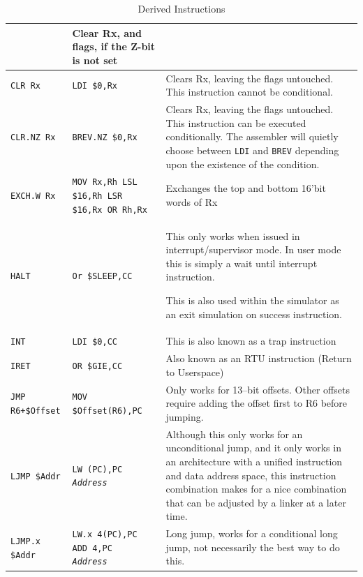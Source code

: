 \documentclass{gqtekspec}
\begin{document}
\begin{table}
\begin{center}
\begin{tabular}{p{1.0in}p{1.5in}p{3in}}
	& Clear Rx, and flags, if the Z-bit is not set \\\hline
{\tt CLR Rx }
	& {\tt LDI \$0,Rx}
	& Clears Rx, leaving the flags untouched.  This instruction cannot be
		conditional. \\\hline
{\tt CLR.NZ Rx }
	& {\tt BREV.NZ \$0,Rx}
	& Clears Rx, leaving the flags untouched.  This instruction can be
		executed conditionally. The assembler will quietly  choose
		between {\tt LDI} and {\tt BREV} depending upon the existence
		of the condition.\\\hline
{\tt EXCH.W Rx }
	& \parbox[t]{1.5in}{\tt MOV Rx,Rh \\
		LSL \$16,Rh \\
		LSR \$16,Rx \\
		OR Rh,Rx }
	& Exchanges the top and bottom 16'bit words of Rx \\\hline
{\tt HALT }
	& {\tt Or \$SLEEP,CC}
	& This only works when issued in interrupt/supervisor mode.  In user
	mode this is simply a wait until interrupt instruction.

	This is also used within the simulator as an exit simulation on
	success instruction.\\\hline
{\tt INT } & {\tt LDI \$0,CC} & This is also known as a trap instruction\\\hline
{\tt IRET}
	& {\tt OR \$GIE,CC}
	& Also known as an RTU instruction (Return to Userspace) \\\hline
\hbox{\tt JMP R6+\$Offset}
	& {\tt MOV \$Offset(R6),PC}
	& Only works for 13--bit offsets.  Other offsets require adding the
	offset first to R6 before jumping.\\\hline
{\tt LJMP \$Addr}
	& \parbox[t]{1.5in}{\tt LW (PC),PC \\ {\em Address }}
	& Although this only works for an unconditional jump, and it only
	works in an architecture with a unified instruction and data address
	space, this instruction combination makes for a nice combination that
	can be adjusted by a linker at a later time.\\\hline
{\tt LJMP.x \$Addr}
	& \parbox[t]{1.5in}{\tt LW.x 4(PC),PC \\ ADD 4,PC \\ {\em Address }}
	& Long jump, works for a conditional long jump, not necessarily the best way to do this.  \\\hline
\end{tabular}
\caption{Derived Instructions}\label{tbl:derived-1}
\end{center}\end{table}
\end{document}
